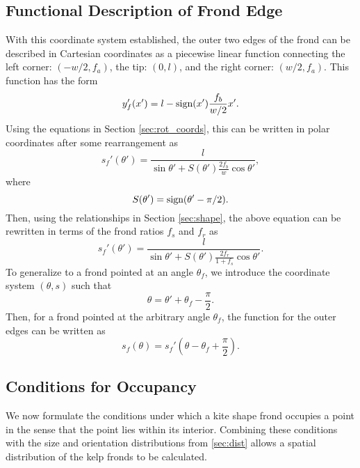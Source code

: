 \subsection{Functional Description of Frond Edge}
With this coordinate system established, the outer two edges of the frond can be described in Cartesian coordinates as a piecewise linear function connecting the left corner: $(-w/2,f_a)$, the tip: $(0,l)$, and the right corner: $(w/2,f_a)$.
This function has the form
\begin{equation*}
	y'_f(x') = l-\mbox{sign}(x')\frac{f_b}{w/2}x'.
\end{equation*}
Using the equations in Section \ref{sec:rot_coords}, this can be written in polar coordinates after some rearrangement as
\begin{equation*}
	s_f'(\theta') = \frac{l}{\sin\theta' + S(\theta')\frac{2f_b}{w}\cos\theta'},
\end{equation*}
where
\begin{equation*}
	S(\theta') = \mbox{sign}(\theta'-\pi/2).
\end{equation*}
Then, using the relationships in Section \ref{sec:shape}, the above equation can be rewritten in terms of the frond ratios $f_s$ and $f_r$ as
\begin{equation*}
	\label{eq:rf_rel}
	s_f'(\theta') = \frac{l}{\sin\theta' + S(\theta')\frac{2f_r}{1+f_s}\cos\theta'}.
\end{equation*}
To generalize to a frond pointed at an angle $\theta_f$, we introduce the coordinate system $(\theta,s)$ such that
\begin{equation*}
	\theta = \theta' + \theta_f - \frac{\pi}{2}.
\end{equation*}
Then, for a frond pointed at the arbitrary angle $\theta_f$, the function for the outer edges can be written as 
\begin{equation*}
	\label{eq:rf_abs}
	s_f(\theta) = s_f'\left(\theta - \theta_f + \frac{\pi}{2} \right).
\end{equation*}

\subsection{Conditions for Occupancy}
We now formulate the conditions under which a kite shape frond occupies a point
in the sense that the point lies within its interior.
Combining these conditions with the size and orientation distributions from \ref{sec:dist}
allows a spatial distribution of the kelp fronds to be calculated.

